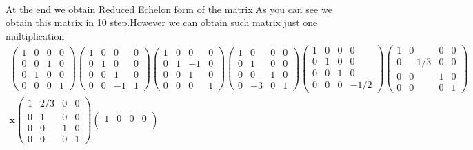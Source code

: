 \documentclass[11pt]{article}
\begin{document}
\paragraph{}At the end we obtain Reduced Echelon form of the matrix.As you can see we obtain this matrix in 10 step.However we can obtain such matrix just one multiplication
\begin{eqnarray*}
\begin{pmatrix}
	1 & 0 & 0 & 0\\
	0 & 0 & 1 & 0\\
	0 & 1 & 0 & 0\\
	0 & 0 & 0 & 1
\end{pmatrix}
\begin{pmatrix}
	1 & 0 & 0 & 0\\
	0 & 1 & 0 & 0\\
	0 & 0 & 1 & 0\\
	0 & 0 & -1 & 1
\end{pmatrix}
\begin{pmatrix}
	1 & 0 & 0 & 0\\
	0 & 1 & -1 & 0\\
	0 & 0 & 1 & 0\\
	0 & 0 & 0 & 1
\end{pmatrix}
\begin{pmatrix}
	1 & 0 & 0 & 0\\
	0 & 1 & 0 & 0\\
	0 & 0 & 1 & 0\\
	0 & -3 & 0 & 1
\end{pmatrix}
\begin{pmatrix}
	1 & 0 & 0 & 0\\
	0 & 1 & 0 & 0\\
	0 & 0 & 1 & 0\\
	0 & 0 & 0 & -1/2
\end{pmatrix}
\begin{pmatrix}
	1 & 0 & 0 & 0\\
	0 & -1/3 & 0 & 0\\
	0 & 0 & 1 & 0\\
	0 & 0 & 0 & 1
\end{pmatrix}
\\
\mathbf{x}
\begin{pmatrix}
	1 & 2/3 & 0 & 0\\
	0 & 1 & 0 & 0\\
	0 & 0 & 1 & 0\\
	0 & 0 & 0 & 1
\end{pmatrix}
\begin{pmatrix}
	1 & 0 & 0 & 0\\

\end{pmatrix}
\end{eqnarray*}
\end{document}
